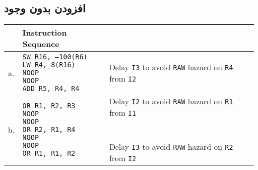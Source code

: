 \documentclass[11pt, dvipsnames, svgnames, x11names]{article}
\begin{document}
\subsection{افزودن  بدون وجود }
\begin{latin}
\begin{table}[H]
\begin{center}
\begin{tabular}{|c|l|l|}
\hline
& Instruction Sequence & \\
\hline
a. &
\makecell[l]{
\texttt{SW R16, –100(R6)} \\
\texttt{LW  R4, 8(R16)} \\
\texttt{NOOP} \\
\texttt{NOOP} \\
\texttt{ADD R5, R4, R4}}&
Delay \texttt{I3} to avoid \texttt{RAW} hazard on \texttt{R4} from \texttt{I2}\\
\hline
b. &
\makecell[l]{
\texttt{OR R1, R2, R3} \\
\texttt{NOOP} \\
\texttt{NOOP} \\
\texttt{OR R2, R1, R4} \\
\texttt{NOOP} \\
\texttt{NOOP} \\
\texttt{OR R1, R1, R2} \\
} &
\makecell[l]{
Delay \texttt{I2} to avoid \texttt{RAW} hazard on \texttt{R1} from \texttt{I1} \\ \\ \\
Delay \texttt{I3} to avoid \texttt{RAW} hazard on \texttt{R2} from \texttt{I2}}
\\
\hline
\end{tabular}
\end{center}
\end{table}
\end{latin}
\end{document}
